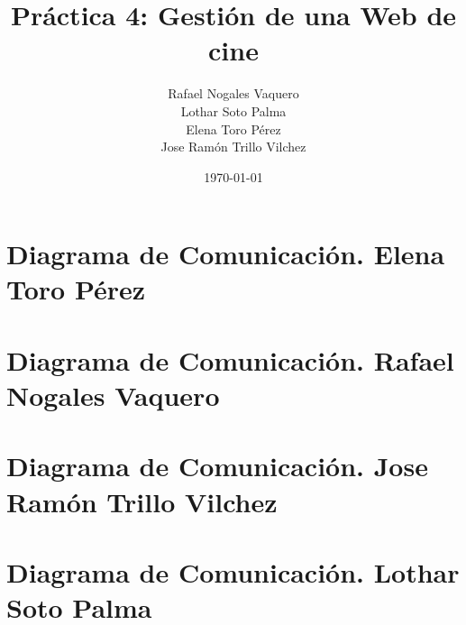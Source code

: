 \documentclass{article}
\title{Práctica 4: Gestión de una Web de cine}
\author{Rafael Nogales Vaquero
\\Lothar Soto Palma
\\Elena Toro Pérez
\\Jose Ramón Trillo Vilchez}
\date{\today}
\begin{document}
\maketitle
\section{Diagrama de Comunicación. Elena Toro Pérez}
\section{Diagrama de Comunicación. Rafael Nogales Vaquero}
\section{Diagrama de Comunicación. Jose Ramón Trillo Vilchez}
\section{Diagrama de Comunicación. Lothar Soto Palma}
\end{document}
